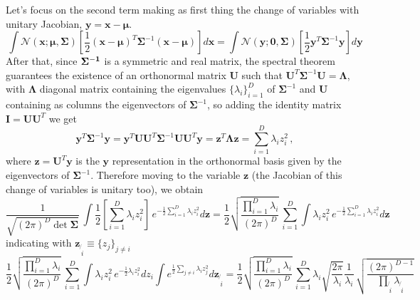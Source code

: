 \documentclass[a4paper, 10pt]{article}
\begin{document}
Let's focus on the second term making as first thing the change of variables with unitary Jacobian, $\mathbf y = \mathbf x - \bm \mu$. 
\begin{equation}
\int \mathcal{N}(\mathbf x; \bm \mu, \bm \Sigma) \left[ \frac{1}{2} (\mathbf x-\boldsymbol \mu)^T \boldsymbol \Sigma^{-1} (\mathbf x-\boldsymbol \mu) \right] d \mathbf x = 
\int \mathcal{N}(\mathbf y; \bm 0, \bm \Sigma) \left[ \frac{1}{2} \mathbf y^T \boldsymbol \Sigma^{-1} \mathbf y \right] d \mathbf y
\end{equation}
After that, since $\bf \Sigma ^{-1}$ is a symmetric and real matrix, the spectral theorem guarantees the existence of an orthonormal matrix $\mathbf U$ such that $ \mathbf U^{T} \mathbf \Sigma^{-1} \mathbf U = \bm \Lambda$, with $\bm \Lambda$ diagonal matrix containing the eigenvalues $\lbrace \lambda_i \rbrace_{i=1}^D$ of $\bm \Sigma^{-1}$ and $\mathbf U$ containing as columns the eigenvectors of $\bm \Sigma^{-1}$, so adding the identity matrix $\mathbf I = \mathbf U \mathbf U^{T}$ we get
\begin{equation}
\mathbf y^{T} \bm \Sigma^{-1} \mathbf y = \mathbf y^{T} \mathbf U \mathbf U^{T} \bm \Sigma^{-1} \mathbf U \mathbf U^{T} \mathbf y = \mathbf z^{T} \bm \Lambda \mathbf z = \sum_{i=1}^{D} \lambda_i z_i^2  \, ,
\end{equation}
where $\mathbf z = \mathbf U^{T} \mathbf y$ is the $\mathbf y$ representation in the orthonormal basis given by the eigenvectors of $\bm \Sigma^{-1}$. Therefore moving to the variable $\mathbf z$ (the Jacobian of this change of variables is unitary too), we obtain
\begin{equation}
\frac{1}{\sqrt{( 2 \pi)^{D} \det \boldsymbol \Sigma}} \, \int \frac{1}{2} \left[ \sum_{i=1}^{D} \lambda_i z_i^2 \right] \, e^{ - \frac{1}{2} \sum_{i=1}^D \lambda_i z_i^2 } d \mathbf z = \frac{1}{2} \sqrt{\frac{\prod_{i=1}^D \lambda_i}{( 2 \pi)^{D}}} \, \sum_{i=1}^{D} \int \lambda_i z_i^2 \, e^{ - \frac{1}{2} \sum_{i=1}^{D} \lambda_i z_i^2} d \mathbf z 
\end{equation}
indicating with $\mathbf z_{\not{ \, i}} \equiv \lbrace z_j \rbrace_{j \neq i}$
\begin{equation}
\frac{1}{2} \sqrt{\frac{\prod_{i=1}^D \lambda_i}{( 2 \pi)^{D}}} \, \sum_{i=1}^{D} \int \lambda_i z_i^2 \, e^{ - \frac{1}{2} \lambda_i z_i^2} d z_i \int e^{\frac{1}{2} \sum_{j \neq i} \lambda_i z_j^2} d \mathbf z_{\not{\, i}} =
\frac{1}{2} \sqrt{\frac{\prod_{i=1}^D \lambda_i}{( 2 \pi)^{D}}} \, \sum_{i=1}^{D} \lambda_i \sqrt{\frac{2 \pi}{\lambda_i}} \frac{1}{\lambda_i} \, \sqrt{\frac{(2\pi)^{D-1}}{\prod_{\not{\, i}} \lambda_{\not{\, i}}}}
\end{equation}
\end{document}
